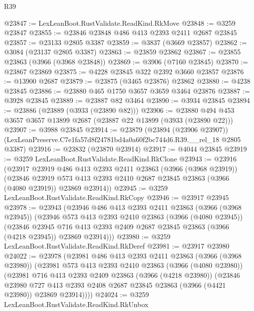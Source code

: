 \begin{lexlean}{R39}
\begin{coremodule}
@23847 := LexLeanBoot.RustValidate.ReadKind.RkMove
@23848 := @3259 @23847
@23855 := @23846 @23848 @486 @413 @2393 @2411 @2687 @23845
@23857 := @23133 @2805 @3387
@23859 := @3837 (@3669 @23857)
@23862 := @3084 (@23137 @2805 @3387)
@23863 := @23859 @23862
@23867 := @23855 @23863 (@3966 (@3968 @23848))
@23869 := @3906 (@7160 @23845)
@23870 := @23867 @23869
@23875 := @4228 @23845 @322 @2392 @3660 @23857
@23876 := @13900 @2687
@23879 := @23875 (@3465 @23876) @23862
@23880 := @4238 @23845
@23886 := @23880 @465 @1750 @3657 @3659 @3464 @23876
@23887 := @3928 @23845
@23889 := @23887 @82 @3464
@23890 := @3934 @23845
@23894 := @23886 (@23889 (@3933 (@23890 @82)))
@23906 := @23880 @494 @453 @3657 @3657 @13899 @2687 (@23887 @22 @13899 (@3933 (@23890 @22)))
@23907 := @3988 @23845
@23914 := @23879
    (@23894 (@23906 @23907))
    (LexLeanPreserve.C7e1fa57d8f24781bd4a0a60f2bc744d6.R39.__rel_18 @2805 @3387)
@23916 := @23832 (@23870 @23914)
@23917 := @4044 @23845
@23919 := @3259 LexLeanBoot.RustValidate.ReadKind.RkClone
@23943 := @23916
    (@23917
      @23919
      @486
      @413
      @2393
      @2411
      @23863
      (@3966 (@3968 @23919))
      (@23846
        @23919
        @573
        @413
        @2393
        @2410
        @2687
        @23845
        @23863
        (@3966 (@4080 @23919))
        @23869
        @23914))
@23945 := @3259 LexLeanBoot.RustValidate.ReadKind.RkCopy
@23946 := @23917 @23945
@23978 := @23943
    (@23946
      @486
      @413
      @2393
      @2411
      @23863
      (@3966 (@3968 @23945))
      (@23946
        @573
        @413
        @2393
        @2410
        @23863
        (@3966 (@4080 @23945))
        (@23846
          @23945
          @716
          @413
          @2393
          @2409
          @2687
          @23845
          @23863
          (@3966 (@4218 @23945))
          @23869
          @23914)))
@23980 := @3259 LexLeanBoot.RustValidate.ReadKind.RkDeref
@23981 := @23917 @23980
@24022 := @23978
    (@23981
      @486
      @413
      @2393
      @2411
      @23863
      (@3966 (@3968 @23980))
      (@23981
        @573
        @413
        @2393
        @2410
        @23863
        (@3966 (@4080 @23980))
        (@23981
          @716
          @413
          @2393
          @2409
          @23863
          (@3966 (@4218 @23980))
          (@23846
            @23980
            @727
            @413
            @2393
            @2408
            @2687
            @23845
            @23863
            (@3966 (@4421 @23980))
            @23869
            @23914))))
@24024 := @3259 LexLeanBoot.RustValidate.ReadKind.RkUnbox

\end{coremodule}
\end{lexlean}
